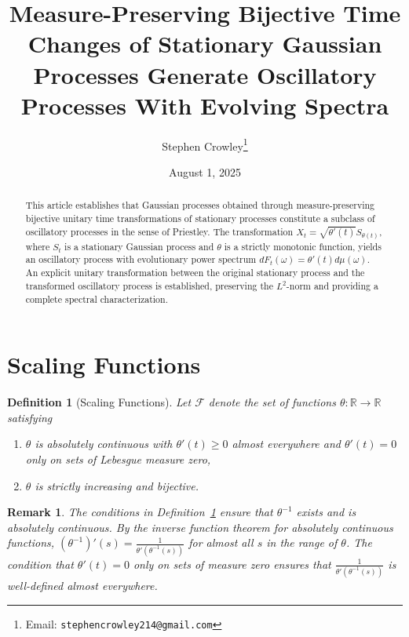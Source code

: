 \documentclass[11pt]{article}
\title{Measure-Preserving Bijective Time Changes of Stationary Gaussian Processes Generate Oscillatory Processes With Evolving Spectra}
\author{Stephen Crowley\thanks{Email: \texttt{stephencrowley214@gmail.com}}}
\date{August 1, 2025}
\newtheorem{definition}{Definition}
\newtheorem{remark}{Remark}
\begin{document}
\maketitle

\begin{abstract}
This article establishes that Gaussian processes obtained through measure-preserving bijective unitary time transformations of stationary processes constitute a subclass of oscillatory processes in the sense of Priestley. The transformation $X_t = \sqrt{\theta'(t)} S_{\theta(t)}$, where $S_t$ is a stationary Gaussian process and $\theta$ is a strictly monotonic function, yields an oscillatory process with evolutionary power spectrum $dF_t(\omega) = \theta'(t) d\mu(\omega)$. An explicit unitary transformation between the original stationary process and the transformed oscillatory process is established, preserving the $L^2$-norm and providing a complete spectral characterization.
\end{abstract}

\section{Scaling Functions}\label{sec:scaling}

\begin{definition}[Scaling Functions]\label{def:scaling}
Let $\mathcal{F}$ denote the set of functions $\theta\colon\mathbb{R}\to\mathbb{R}$ satisfying
\begin{enumerate}[label=(\alph*)]
    \item $\theta$ is absolutely continuous with $\theta'(t) \geq 0$ almost everywhere and $\theta'(t) = 0$ only on sets of Lebesgue measure zero,
    \item $\theta$ is strictly increasing and bijective.
\end{enumerate}
\end{definition}

\begin{remark}\label{rem:inverse_properties}
The conditions in Definition~\ref{def:scaling} ensure that $\theta^{-1}$ exists and is absolutely continuous. By the inverse function theorem for absolutely continuous functions, $(\theta^{-1})'(s) = \frac{1}{\theta'(\theta^{-1}(s))}$ for almost all $s$ in the range of $\theta$. The condition that $\theta'(t) = 0$ only on sets of measure zero ensures that $\frac{1}{\theta'(\theta^{-1}(s))}$ is well-defined almost everywhere.
\end{remark}
\end{document}
